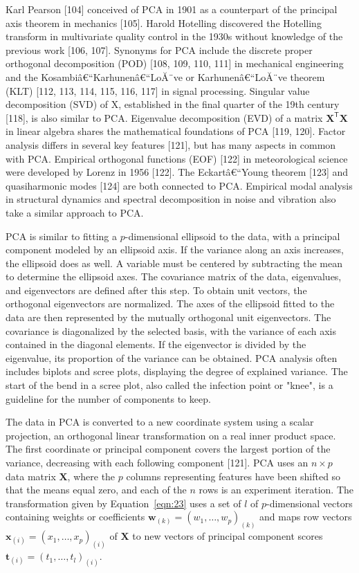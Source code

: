 \documentclass[preprint,12pt]{elsarticle}
\begin{document}
Karl Pearson [104] conceived of PCA in 1901 as a counterpart of the principal axis theorem in mechanics [105]. Harold Hotelling discovered the Hotelling transform in multivariate quality control in the 1930s without knowledge of the previous work [106, 107]. Synonyms for PCA include the discrete proper orthogonal decomposition (POD) [108, 109, 110, 111] in mechanical engineering and the Kosambiâ€“Karhunenâ€“LoĂ¨ve or Karhunenâ€“LoĂ¨ve theorem (KLT) [112, 113, 114, 115, 116, 117] in signal processing. Singular value decomposition (SVD) of X, established in the final quarter of the 19th century [118], is also similar to PCA. Eigenvalue decomposition (EVD) of a matrix $\mathbf{X}^{\mathsf{T}}\mathbf{X}$ in linear algebra shares the mathematical foundations of PCA [119, 120]. Factor analysis differs in several key features [121], but has many aspects in common with PCA. Empirical orthogonal functions (EOF) [122] in meteorological science were developed by Lorenz in 1956 [122]. The Eckartâ€“Young theorem [123] and quasiharmonic modes [124] are both connected to PCA. Empirical modal analysis in structural dynamics and spectral decomposition in noise and vibration also take a similar approach to PCA.

PCA is similar to fitting a $p$-dimensional ellipsoid to the data, with a principal component modeled by an ellipsoid axis. If the variance along an axis increases, the ellipsoid does as well.
A variable must be centered by subtracting the mean to determine the ellipsoid axes. The covariance matrix of the data, eigenvalues, and eigenvectors are defined after this step. To obtain unit vectors, the orthogonal eigenvectors are normalized. The axes of the ellipsoid fitted to the data are then represented by the mutually orthogonal unit eigenvectors. The covariance is diagonalized by the selected basis, with the variance of each axis contained in the diagonal elements. If the eigenvector is divided by the eigenvalue, its proportion of the variance can be obtained.
PCA analysis often includes biplots and scree plots, displaying the degree of explained variance. The start of the bend in a scree plot, also called the infection point or "knee", is a guideline for the number of components to keep.

The data in PCA is converted to a new coordinate system using a scalar projection, an orthogonal linear transformation on a real inner product space. The first coordinate or principal component covers the largest portion of the variance, decreasing with each following component [121].
PCA uses an $n\times p$ data matrix $\mathbf{X}$, where the $p$ columns representing features have been shifted so that the means equal zero, and each of the $n$ rows is an experiment iteration.
The transformation given by Equation~\ref{eqn:23} uses a set of $l$ of $p$-dimensional vectors containing weights or coefficients $\mathbf{w}_{\left(k\right)}=(w_{1},\dots ,w_{p})_{\left(k\right)}$ and maps row vectors $\mathbf{x}_{\left(i\right)}=(x_{1},\dots ,x_{p})_{\left(i\right)}$ of $\mathbf{X}$ to new vectors of principal component scores $\mathbf{t}_{\left(i\right)}=(t_{1},\dots ,t_{l})_{\left(i\right)}$.
\end{document}
